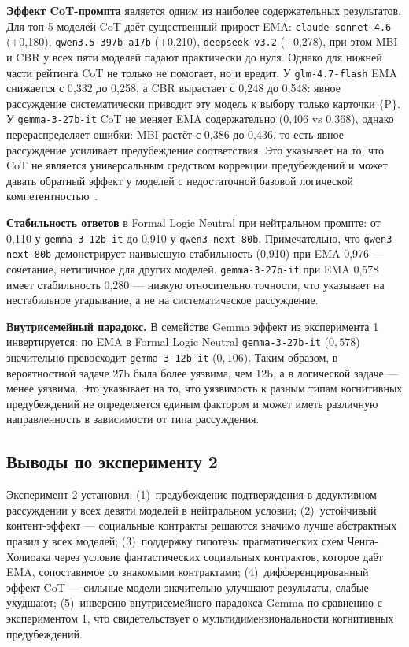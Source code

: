 \textbf{Эффект CoT-промпта} является одним из наиболее содержательных результатов. Для топ-5 моделей CoT даёт существенный прирост EMA: \texttt{claude-sonnet-4.6} (+0,180), \texttt{qwen3.5-397b-a17b} (+0,210), \texttt{deepseek-v3.2} (+0,278), при этом MBI и CBR у всех пяти моделей падают практически до нуля. Однако для нижней части рейтинга CoT не только не помогает, но и вредит. У \texttt{glm-4.7-flash} EMA снижается с 0,332 до 0,258, а CBR вырастает с 0,248 до 0,548: явное рассуждение систематически приводит эту модель к выбору только карточки $\{$P$\}$. У \texttt{gemma-3-27b-it} CoT не меняет EMA содержательно (0,406 vs 0,368), однако перераспределяет ошибки: MBI растёт с 0,386 до 0,436, то есть явное рассуждение усиливает предубеждение соответствия. Это указывает на то, что CoT не является универсальным средством коррекции предубеждений и может давать обратный эффект у моделей с недостаточной базовой логической компетентностью~\cite{kojima2022large}.

\textbf{Стабильность ответов} в Formal Logic Neutral при нейтральном промпте: от 0,110 у \texttt{gemma-3-12b-it} до 0,910 у \texttt{qwen3-next-80b}. Примечательно, что \texttt{qwen3-next-80b} демонстрирует наивысшую стабильность (0,910) при EMA 0,976 --- сочетание, нетипичное для других моделей. \texttt{gemma-3-27b-it} при EMA 0,578 имеет стабильность 0,280 --- низкую относительно точности, что указывает на нестабильное угадывание, а не на систематическое рассуждение.

\textbf{Внутрисемейный парадокс.} В семействе Gemma эффект из эксперимента 1 инвертируется: по EMA в Formal Logic Neutral \texttt{gemma-3-27b-it} ($0{,}578$) значительно превосходит \texttt{gemma-3-12b-it} ($0{,}106$). Таким образом, в вероятностной задаче 27b была более уязвима, чем 12b, а в логической задаче --- менее уязвима. Это указывает на то, что уязвимость к разным типам когнитивных предубеждений не определяется единым фактором и может иметь различную направленность в зависимости от типа рассуждения.

\subsection{Выводы по эксперименту 2}

Эксперимент 2 установил: (1)~предубеждение подтверждения в дедуктивном рассуждении у всех девяти моделей в нейтральном условии; (2)~устойчивый контент-эффект --- социальные контракты решаются значимо лучше абстрактных правил у всех моделей; (3)~поддержку гипотезы прагматических схем Ченга-Холиоака через условие фантастических социальных контрактов, которое даёт EMA, сопоставимое со знакомыми контрактами; (4)~дифференцированный эффект CoT --- сильные модели значительно улучшают результаты, слабые ухудшают; (5)~инверсию внутрисемейного парадокса Gemma по сравнению с экспериментом 1, что свидетельствует о мультидимензиональности когнитивных предубеждений.

